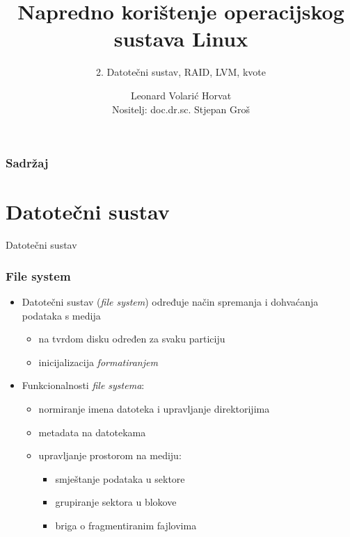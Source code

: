 \documentclass[t]{beamer}
\date{\todayiso}
\title[NKOSL]{Napredno korištenje operacijskog sustava Linux}
\author[Leonard Volarić Horvat]{Leonard Volarić Horvat\\ {\small Nositelj: doc.dr.sc. Stjepan Groš}}
\subtitle{2. Datotečni sustav, RAID, LVM, kvote}
\institute[FER]{Sveučilište u Zagrebu\\Fakultet elektrotehnike i računarstva}
\begin{document}
{
	\begin{frame}
		\maketitle
	\end{frame}
}

\begin{frame}
	\frametitle{Sadržaj}
	\tableofcontents
\end{frame}

\section{Datotečni sustav}

\begin{frame}
	\vspace*{\fill}
		\begin{center}
			\Huge{Datotečni sustav}
		\end{center}
	\vspace*{\fill}
\end{frame}

\begin{frame}
	\frametitle{File system}
	\begin{itemize}
	    \item Datotečni sustav (\textit{file system}) određuje način spremanja i dohvaćanja podataka s medija
		\begin{itemize}
			\item na tvrdom disku određen za svaku particiju
			\item inicijalizacija \textit{formatiranjem}
		\end{itemize}
		\vfill
		\item Funkcionalnosti \textit{file systema}:
		\begin{itemize}
			\item normiranje imena datoteka i upravljanje direktorijima
			\item metadata na datotekama
			\item upravljanje prostorom na mediju:
			\begin{itemize}
				\item smještanje podataka u sektore
				\item grupiranje sektora u blokove
				\item briga o fragmentiranim fajlovima
			\end{itemize}
	    \end{itemize}
	\end{itemize}
\end{frame}
\end{document}
